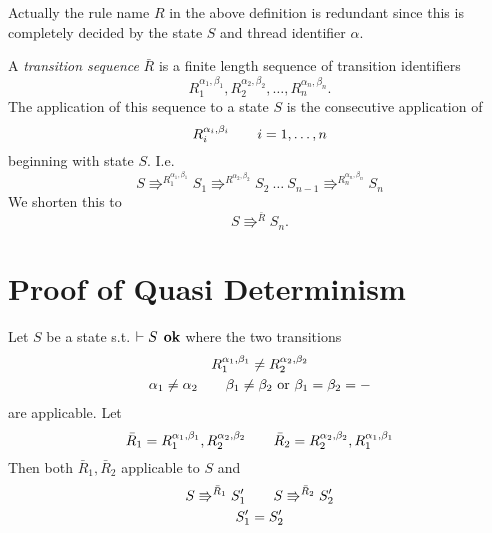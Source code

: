 \begin{remark}
  Actually the rule name $R$ in the above definition is redundant since this is
  completely decided by the state $S$ and thread identifier $\alpha$.
\end{remark}

\begin{definition}
  A \emph{transition sequence} $\bar{R}$ is a finite length sequence of
  transition identifiers
  \begin{equation*}
    R_1^{\alpha_1, \beta_1}, R_2^{\alpha_2, \beta_2}, \dots, R_n^{\alpha_n,
    \beta_n}.
  \end{equation*}
  The application of this sequence to a state $S$ is the consecutive application
  of
  \begin{equation*}
    R_i^{\alpha_i, \beta_i} \quad\quad i = 1, \dots, n
  \end{equation*}
  beginning with state $S$. I.e.
  \begin{equation*} 
    S \Rrightarrow^{R_1^{\alpha_1, \beta_1}} S_1 \Rrightarrow^{R^{\alpha_2,
    \beta_2}} S_2  \: \dots \: S_{n-1} \Rrightarrow^{R_n^{\alpha_n, \beta_n}} S_n
  \end{equation*}
  We shorten this to
  \begin{equation*}
    S \Rrightarrow^{\bar{R}} S_n.
  \end{equation*}
\end{definition}


\section{Proof of Quasi Determinism}
\label{sec:proof_of_quasi_determinism}

\begin{lemma} \label{lem:lemma1}
  Let $S$ be a state s.t. $\vdash S \:\: \mbox{\bf ok}$ where the two transitions
  \begin{equation*}
    \begin{gathered}
      R_1^{\alpha_1, \beta_1} \neq R_2^{\alpha_2, \beta_2} \\
      \alpha_1 \neq \alpha_2 \quad\quad \beta_1 \neq \beta_2 \text{ or } \beta_1 =
      \beta_2 = - 
    \end{gathered}
  \end{equation*}
  are applicable.
  Let
  \begin{equation*}
    \bar{R}_1  = R_1^{\alpha_1, \beta_1}, R_2^{\alpha_2, \beta_2} \quad\quad
    \bar{R}_2 = R_2^{\alpha_2, \beta_2}, R_1^{\alpha_1, \beta_1}
  \end{equation*}
  Then both $\bar{R}_1, \bar{R}_2$ applicable to $S$ and
  \begin{equation*}
    \begin{gathered}
      S \Rrightarrow^{\bar{R}_1} S'_1 \quad\quad S \Rrightarrow^{\bar{R}_2} S'_2
      \\
      S'_1 = S'_2
    \end{gathered}
  \end{equation*}
\end{lemma}

